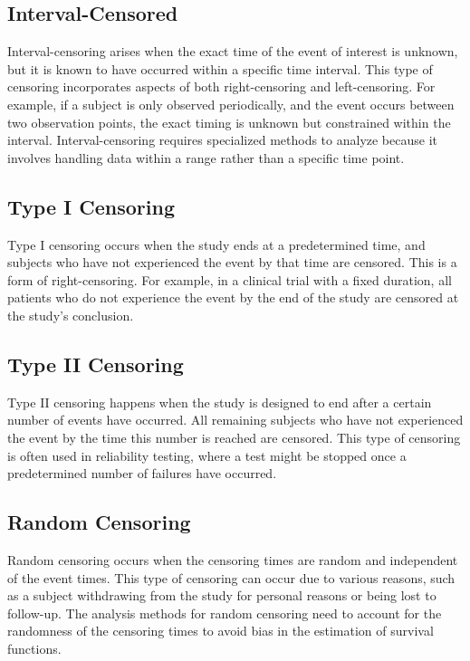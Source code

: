 \documentclass[doublespacing,12pt]{report}
\begin{document}
\subsection{Interval-Censored}

Interval-censoring arises when the exact time of the event of interest is unknown, but it is known to have occurred within a specific time interval. This type of censoring incorporates aspects of both right-censoring and left-censoring. For example, if a subject is only observed periodically, and the event occurs between two observation points, the exact timing is unknown but constrained within the interval. Interval-censoring requires specialized methods to analyze because it involves handling data within a range rather than a specific time point.
\subsection{Type I Censoring}

Type I censoring occurs when the study ends at a predetermined time, and subjects who have not experienced the event by that time are censored. This is a form of right-censoring. For example, in a clinical trial with a fixed duration, all patients who do not experience the event by the end of the study are censored at the study's conclusion.

\subsection{Type II Censoring}

Type II censoring happens when the study is designed to end after a certain number of events have occurred. All remaining subjects who have not experienced the event by the time this number is reached are censored. This type of censoring is often used in reliability testing, where a test might be stopped once a predetermined number of failures have occurred.

\subsection{Random Censoring}

Random censoring occurs when the censoring times are random and independent of the event times. This type of censoring can occur due to various reasons, such as a subject withdrawing from the study for personal reasons or being lost to follow-up. The analysis methods for random censoring need to account for the randomness of the censoring times to avoid bias in the estimation of survival functions.
\end{document}
